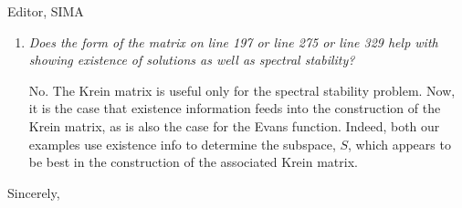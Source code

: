 \documentclass[11pt]{letter}
\begin{document}
\begin{letter}{Editor, SIMA}
\begin{enumerate}
\item \emph{Does the form of the matrix on line 197 or line 275 or line 329 help with showing existence of solutions as well as spectral stability?}

No. The Krein matrix is useful only for the spectral stability problem. Now, it is the case that existence information feeds into the construction of the Krein matrix, as is also the case for the Evans function. Indeed, both our examples use existence info to determine the subspace, $S$, which appears to be best in the construction of the associated Krein matrix.

\end{enumerate}


\closing{Sincerely,}

\end{letter}
\end{document}
